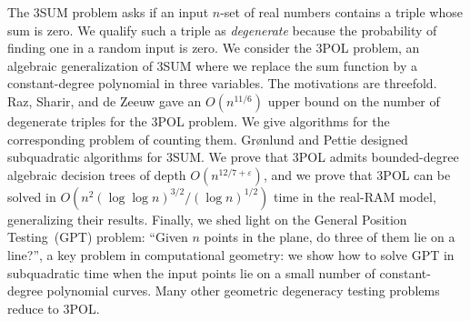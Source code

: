 The 3SUM problem asks if an input $n$-set of real numbers contains a
triple whose sum is zero.
%
We qualify such a triple as \emph{degenerate} because the probability of
finding one in a random input is zero.
%
We consider the 3POL problem, an algebraic generalization of 3SUM where we
replace the sum function by a constant-degree polynomial in three variables.
%
The motivations are threefold.
%
Raz, Sharir, and de Zeeuw gave an $O(n^{11/6})$ upper bound on the number of
degenerate triples for the 3POL problem. We give algorithms for the
corresponding problem of counting them.
%
Gr\o nlund and Pettie designed subquadratic algorithms for 3SUM\@. We
prove that 3POL admits bounded-degree algebraic decision trees of depth
$O(n^{12/7+\varepsilon})$, and we prove that 3POL can be solved in $O(n^2
{(\log \log n)}^{3/2} / {(\log n)}^{1/2})$ time in the real-RAM model,
generalizing their results.
%
Finally, we shed light on the General
Position Testing~(GPT) problem: ``Given $n$ points in the plane, do three of
them lie on a line?'', a key problem in computational geometry: we show how to
solve GPT in subquadratic time when the input points lie on a small number of
constant-degree polynomial curves. Many other geometric degeneracy testing
problems reduce to 3POL\@.
%

